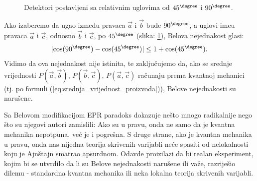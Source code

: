 \begin{figure}[h]
    \centering
    \caption{Detektori postavljeni sa relativnim uglovima od $45^\degree$ i $90^\degree$.}
    \label{fig:detectors_with_chosen_angles}
\end{figure}

Ako izaberemo da ugao između pravaca $\vec{a}$ i $\vec{b}$ bude $90^\degree$, a uglovi ime\dj u pravaca $\vec{a}$ i $\vec{c}$, odnosno $\vec{b}$ i $\vec{c}$, po $45^\degree$ (slika: \ref{fig:detectors_with_chosen_angles}), Belova nejednakost glasi:
\begin{equation*}
    | \mathrm{cos}(90^\degree) - \mathrm{cos}(45^\degree)|\le 1 + \mathrm{cos}(45^\degree).
\end{equation*}
Vidimo da ova nejednakost nije istinita, te zaključujemo da, ako se srednje vrijednosti $P(\vec{a},\vec{b})$, $P(\vec{b},\vec{c})$, $P(\vec{a},\vec{c})$ računaju prema kvantnoj mehanici (tj. po formuli (\ref{eq:srednja_vrijednost_proizvoda})), Belove nejednakosti su narušene.

Sa Belovom modifikacijom EPR paradoks dokazuje nešto mnogo radikalnije nego što su njegovi autori zamislili:
Ako su u pravu, onda ne samo da je kvantna mehanika nepotpuna, već je i pogrešna.
S druge strane, ako je kvantna mehanika u pravu, onda nas nijedna teorija skrivenih varijabli neće spasiti od nelokalnosti koju je Ajnštajn smatrao apsurdnom.
Odavde proizilazi da bi realan eksperiment, kojim bi se utvrdilo da li su Belove nejednakosti narušene ili važe, razriješio dilemu - standardna kvantna mehanika ili neka lokalna teorija skrivenih varijabli.
